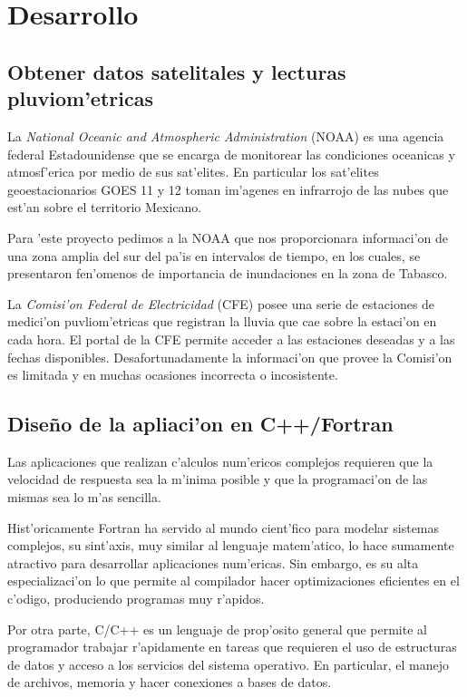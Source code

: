 \chapter{Desarrollo}

\section{Obtener datos satelitales y lecturas pluviom'etricas}

  La  \textit{National Oceanic and Atmospheric Administration} (NOAA) es una agencia federal Estadounidense que se encarga de 
  monitorear las condiciones oceanicas y atmosf'erica por medio de sus sat'elites.
  En particular los sat'elites geoestacionarios GOES 11 y 12 toman im'agenes en infrarrojo de las nubes que est'an sobre
  el territorio Mexicano.

  Para 'este proyecto pedimos a la NOAA que nos proporcionara informaci'on de una zona amplia del sur del pa'is en 
  intervalos de tiempo, en los cuales, se presentaron fen'omenos de importancia de inundaciones en la zona de Tabasco.

  La \textit{Comisi'on Federal de Electricidad} (CFE) posee una serie de estaciones de medici'on puvliom'etricas que registran 
  la lluvia que cae sobre la estaci'on en cada hora. El portal de la CFE permite acceder a las estaciones deseadas 
  y a las fechas disponibles. Desafortunadamente la informaci'on que provee la Comisi'on es limitada y en muchas 
  ocasiones incorrecta o incosistente.




\section{Dise\~no de la apliaci'on en C++/Fortran}
  Las aplicaciones que realizan c'alculos num'ericos complejos requieren que la velocidad de respuesta sea la m'inima posible y que
  la programaci'on de las mismas sea lo m'as sencilla.

  Hist'oricamente Fortran ha servido al mundo cient'fico para modelar sistemas complejos, su sint'axis, 
  muy similar al lenguaje matem'atico, lo hace sumamente atractivo para desarrollar aplicaciones num'ericas. Sin embargo,
  es su alta especializaci'on lo que permite al compilador hacer optimizaciones eficientes en el c'odigo, produciendo
  programas muy r'apidos.

  Por otra parte, C/C++ es un lenguaje de prop'osito general que permite al programador trabajar r'apidamente en tareas que requieren
  el uso de estructuras de datos y acceso a los servicios del sistema operativo. 
  En particular, el manejo de archivos, memoria y hacer conexiones a bases de datos.

